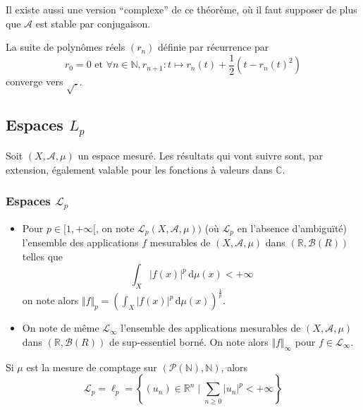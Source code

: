 	\begin{remark}
		Il existe aussi une version ``complexe'' de ce théorème, où il faut supposer de plus que $\mathcal{A}$ est stable par conjugaison.
	\end{remark}

	\begin{example}
		La suite de polynômes réels $(r_n)$ définie par récurrence par
		\[ r_0 = 0 \text{ et } \forall n \in \mathbb{N}, r_{n+1} : t \mapsto r_n(t) + \frac{1}{2} (t - r_n(t)^2) \]
		converge vers $\sqrt{.}$.
	\end{example}

	\subsection{Espaces \texorpdfstring{$L_p$}{Lp}}


	Soit $(X, \mathcal{A}, \mu)$ un espace mesuré. Les résultats qui vont suivre sont, par extension, également valable pour les fonctions à valeurs dans $\mathbb{C}$.

	\subsubsection{Espaces \texorpdfstring{$\mathcal{L}_p$}{ℒp}}

	\begin{definition}
		\begin{itemize}
			\item Pour $p \in [1, +\infty[$, on note $\mathcal{L}_p(X, \mathcal{A}, \mu))$ (où $\mathcal{L}_p$ en l'absence d'ambiguïté) l'ensemble des applications $f$ mesurables de $(X, \mathcal{A}, \mu)$ dans $(\mathbb{R}, \mathcal{B}(R))$ telles que
			\[ \int_X \vert f(x) \vert^p \, \mathrm{d}\mu(x) < +\infty \]
			on note alors $\Vert f \Vert_p = \left(\int_X \vert f(x) \vert^p \, \mathrm{d}\mu(x)\right)^{\frac{1}{p}}$.
			\item On note de même $\mathcal{L}_\infty$ l'ensemble des applications mesurables de $(X, \mathcal{A}, \mu)$ dans $(\mathbb{R}, \mathcal{B}(R))$ de sup-essentiel borné. On note alors $\Vert f \Vert_\infty$ pour $f \in \mathcal{L}_\infty$.
		\end{itemize}
	\end{definition}


	\begin{example}
		Si $\mu$ est la mesure de comptage sur $(\mathcal{P}(\mathbb{N}), \mathbb{N})$, alors
		\[ \mathcal{L}_p = \ell_p = \left\{ (u_n) \in \mathbb{R}^n \mid \sum_{n \geq 0} \vert u_n \vert^p < +\infty \right\} \]
	\end{example}

